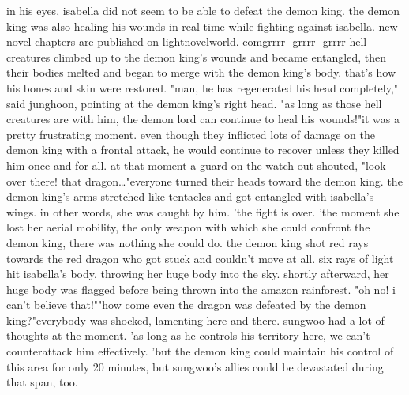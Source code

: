 in his eyes, isabella did not seem to be able to defeat the demon king.
the demon king was also healing his wounds in real-time while fighting against isabella.
new novel chapters are published on lightnovelworld.
c‌omgrrrr- grrrr- grrrr-hell creatures climbed up to the demon king's wounds and became entangled, then their bodies melted and began to merge with the demon king's body.
 that's how his bones and skin were restored.
"man, he has regenerated his head completely," said junghoon, pointing at the demon king's right head.
 "as long as those hell creatures are with him, the demon lord can continue to heal his wounds!"it was a pretty frustrating moment.
 even though they inflicted lots of damage on the demon king with a frontal attack, he would continue to recover unless they killed him once and for all.
at that moment a guard on the watch out shouted, "look over there! that dragon…"everyone turned their heads toward the demon king.
the demon king's arms stretched like tentacles and got entangled with isabella's wings.
 in other words, she was caught by him.
 'the fight is over.
'the moment she lost her aerial mobility, the only weapon with which she could confront the demon king, there was nothing she could do.
the demon king shot red rays towards the red dragon who got stuck and couldn't move at all.
six rays of light hit isabella's body, throwing her huge body into the sky.
shortly afterward, her huge body was flagged before being thrown into the amazon rainforest.
"oh no! i can't believe that!""how come even the dragon was defeated by the demon king?"everybody was shocked, lamenting here and there.
 sungwoo had a lot of thoughts at the moment.
 'as long as he controls his territory here, we can't counterattack him effectively.
'but the demon king could maintain his control of this area for only 20 minutes, but sungwoo's allies could be devastated during that span, too.

